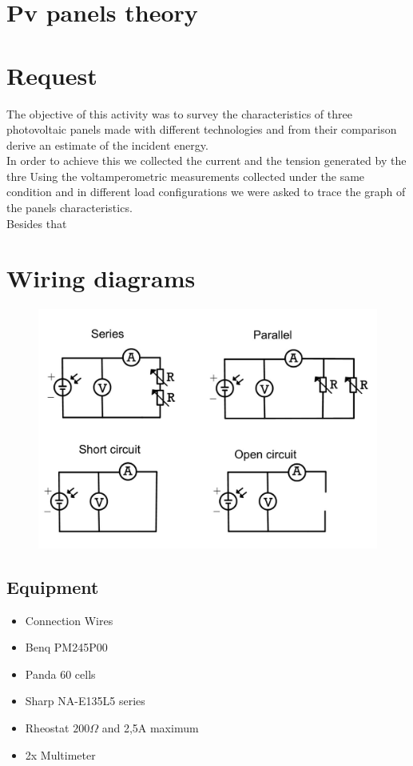 \documentclass[12pt]{article}
\begin{document}
\section{Pv panels theory}

\section{Request}
The objective of this activity was to survey the characteristics of three photovoltaic panels made with different
technologies and from their comparison derive an estimate of the incident energy.\\
In order to achieve this we collected the current and the tension generated by the thre
Using the voltamperometric measurements collected under the same condition and in different load configurations we were asked to trace the graph of the
panels characteristics.\\
Besides that
\section{Wiring diagrams}
\begin{figure}[ht]
	\centering
	\includegraphics[scale=0.2]{schema.jpg}
\end{figure}
\subsection{Equipment}
\begin{itemize}
    \item Connection Wires
    \item Benq PM245P00
    \item Panda 60 cells
    \item Sharp NA-E135L5 series
    \item Rheostat  $200\Omega$ and 2,5A maximum
    \item 2x Multimeter
    \end{itemize}
\end{document}

